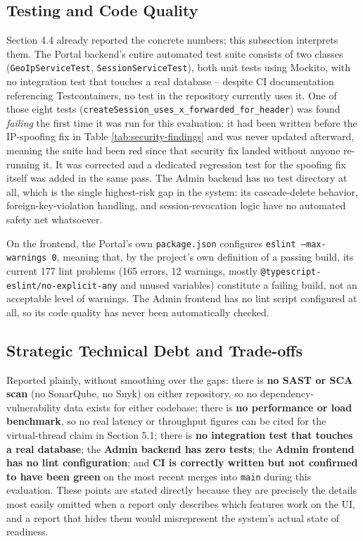 \documentclass[12pt,a4paper]{report}
\begin{document}
\subsection{Testing and Code Quality}

Section 4.4 already reported the concrete numbers; this subsection
interprets them. The Portal backend's entire automated test suite
consists of two classes (\texttt{GeoIpServiceTest},
\texttt{SessionServiceTest}), both unit tests using Mockito, with no
integration test that touches a real database -- despite CI
documentation referencing Testcontainers, no test in the repository
currently uses it. One of those eight tests
(\texttt{createSession\_uses\_x\_forwarded\_for\_header}) was found
\emph{failing} the first time it was run for this evaluation: it had
been written before the IP-spoofing fix in Table
\ref{tab:security-findings} and was never updated afterward, meaning
the suite had been red since that security fix landed without anyone
re-running it. It was corrected and a dedicated regression test for the
spoofing fix itself was added in the same pass. The Admin backend has
no test directory at all, which is the single highest-risk gap in the
system: its cascade-delete behavior, foreign-key-violation handling,
and session-revocation logic have no automated safety net whatsoever.

On the frontend, the Portal's own \texttt{package.json} configures
\texttt{eslint --max-warnings 0}, meaning that, by the project's own
definition of a passing build, its current 177 lint problems (165
errors, 12 warnings, mostly \texttt{@typescript-eslint/no-explicit-any}
and unused variables) constitute a failing build, not an acceptable
level of warnings. The Admin frontend has no lint script configured at
all, so its code quality has never been automatically checked.

\subsection{Strategic Technical Debt and Trade-offs}

Reported plainly, without smoothing over the gaps: there is
\textbf{no SAST or SCA scan} (no SonarQube, no Snyk) on either
repository, so no dependency-vulnerability data exists for either
codebase; there is \textbf{no performance or load benchmark}, so no
real latency or throughput figures can be cited for the virtual-thread
claim in Section 5.1; there is \textbf{no integration test that touches
a real database}; the \textbf{Admin backend has zero tests}; the
\textbf{Admin frontend has no lint configuration}; and \textbf{CI is
correctly written but not confirmed to have been green} on the most
recent merges into \texttt{main} during this evaluation. These points
are stated directly because they are precisely the details most easily
omitted when a report only describes which features work on the UI,
and a report that hides them would misrepresent the system's actual
state of readiness.
\end{document}
